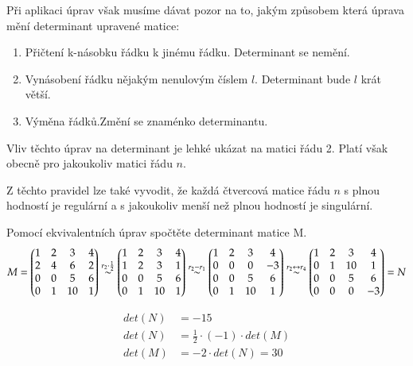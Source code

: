 Při aplikaci úprav však musíme dávat pozor na to, jakým způsobem která úprava mění
determinant upravené matice:

\begin{enumerate}
    \item Přičtení k-násobku řádku k jinému řádku. \hfill Determinant se nemění.
    \item Vynásobení řádku nějakým nenulovým číslem $l$. \hfill Determinant bude $l$ krát větší.
    \item Výměna řádků.\hfill Změní se znaménko determinantu.
\end{enumerate}

Vliv těchto úprav na determinant je lehké ukázat na matici řádu 2. Platí však obecně pro
jakoukoliv matici řádu $n$.

Z těchto pravidel lze také vyvodit, že každá čtvercová matice řádu $n$ s plnou hodností
je regulární a s jakoukoliv menší než plnou hodností je singulární.

\begin{example}
    Pomocí ekvivalentních úprav spočtěte determinant matice M.
    \[M=
    \begin{pmatrix}
        1 & 2 & 3 & 4 \\
        2 & 4 & 6 & 2 \\
        0 & 0 & 5 & 6 \\
        0 & 1 & 10 & 1
    \end{pmatrix}
    \overset{r_2 \cdot  \frac{1}{2}} \sim
    \begin{pmatrix}
        1 & 2 & 3 & 4 \\
        1 & 2 & 3 & 1 \\
        0 & 0 & 5 & 6 \\
        0 & 1 & 10 & 1
    \end{pmatrix} \overset{r_2 - r_1} \sim
    \begin{pmatrix}
        1 & 2 & 3 & 4 \\
        0 & 0 & 0 & -3 \\
        0 & 0 & 5 & 6 \\
        0 & 1 & 10 & 1
    \end{pmatrix} \overset{r_2 \leftrightarrow r_4} \sim
    \begin{pmatrix}
        1 & 2 & 3 & 4 \\
        0 & 1 & 10 & 1 \\
        0 & 0 & 5 & 6 \\
        0 & 0 & 0 & -3
    \end{pmatrix} = N
    \]

    \begin{align*}
        det(N) &= -15\\
        det(N) &= \frac{1}{2} \cdot (-1) \cdot det(M)\\
        det(M) &= -2 \cdot det(N) = 30
    \end{align*}
\end{example}

